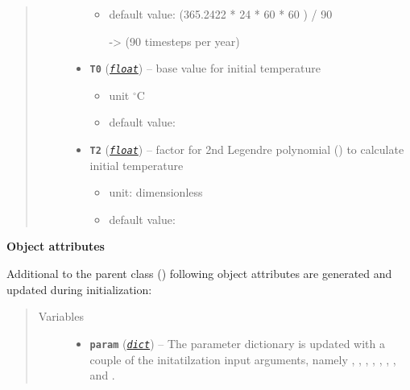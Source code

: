 \documentclass[a4paper,10pt,english]{sphinxmanual}
\begin{document}
\begin{fulllineitems}
\begin{quote}
\begin{description}
\begin{itemize}
\begin{itemize}
\item {} 
default value: (365.2422 * 24 * 60 * 60 ) / 90

-\textgreater{} (90 timesteps per year)

\end{itemize}


\item {} 
\textbf{\texttt{T0}} (\href{http://docs.python.org/2.7/library/functions.html\#float}{\emph{\texttt{float}}}) -- 
base value for initial temperature
\begin{itemize}
\item {} 
unit \(^{\circ} \textrm{C}\)

\item {} 
default value: 

\end{itemize}


\item {} 
\textbf{\texttt{T2}} (\href{http://docs.python.org/2.7/library/functions.html\#float}{\emph{\texttt{float}}}) -- 
factor for 2nd Legendre polynomial 
{\hyperref[api/climlab.utils:climlab.utils.legendre.P2]{\emph{}}} () 
to calculate initial temperature
\begin{itemize}
\item {} 
unit: dimensionless

\item {} 
default value: 

\end{itemize}


\end{itemize}

\end{description}\end{quote}

\textbf{Object attributes}

Additional to the parent class {\hyperref[api/climlab.process:climlab.process.energy_budget.EnergyBudget]{\emph{}}} ()
following object attributes are generated and updated during initialization:
\begin{quote}\begin{description}
\item[{Variables}] \leavevmode\begin{itemize}
\item {} 
\textbf{\texttt{param}} (\href{http://docs.python.org/2.7/library/stdtypes.html\#dict}{\emph{\texttt{dict}}}) -- The parameter dictionary is updated with a couple 
of the initatilzation input arguments, namely
, , , , , 
, ,  and .


\end{itemize}
\end{description}
\end{quote}
\end{fulllineitems}
\end{document}
